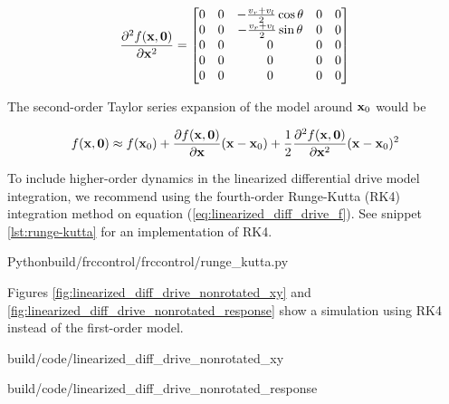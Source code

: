 \begin{equation*}
  \frac{\partial^2 f(\mathbf{x}, \mathbf{0})}{\partial\mathbf{x}^2} =
  \begin{bmatrix}
    0 & 0 & -\frac{v_r + v_l}{2}\cos\theta & 0 & 0 \\
    0 & 0 & -\frac{v_r + v_l}{2}\sin\theta & 0 & 0 \\
    0 & 0 & 0 & 0 & 0 \\
    0 & 0 & 0 & 0 & 0 \\
    0 & 0 & 0 & 0 & 0
  \end{bmatrix}
\end{equation*}

The second-order Taylor series expansion of the \gls{model} around $\mathbf{x}_0$
would be

\begin{equation*}
  f(\mathbf{x}, \mathbf{0}) \approx f(\mathbf{x}_0) +
    \frac{\partial f(\mathbf{x}, \mathbf{0})}{\partial\mathbf{x}}(\mathbf{x} - \mathbf{x}_0) +
    \frac{1}{2}\frac{\partial^2 f(\mathbf{x}, \mathbf{0})}{\partial\mathbf{x}^2}
    (\mathbf{x} - \mathbf{x}_0)^2
\end{equation*}

To include higher-order dynamics in the linearized differential drive model
integration, we recommend using the fourth-order Runge-Kutta (RK4) integration
method on equation (\ref{eq:linearized_diff_drive_f}). See snippet
\ref{lst:runge-kutta} for an implementation of RK4.

\begin{code}{Python}{build/frccontrol/frccontrol/runge_kutta.py}
  \caption{Fourth-order Runge-Kutta integration in Python}
  \label{lst:runge-kutta}
\end{code}

Figures \ref{fig:linearized_diff_drive_nonrotated_xy} and
\ref{fig:linearized_diff_drive_nonrotated_response} show a simulation using RK4
instead of the first-order \gls{model}.

\begin{bookfigure}
  \begin{minisvg}{build/code/linearized_diff_drive_nonrotated_xy}
    \caption{Linearized differential drive controller (global reference frame
      formulation) x-y plot}
    \label{fig:linearized_diff_drive_nonrotated_xy}
  \end{minisvg}
  \hfill
  \begin{minisvg}{build/code/linearized_diff_drive_nonrotated_response}
    \caption{Linearized differential drive controller (global reference frame
      formulation) response}
    \label{fig:linearized_diff_drive_nonrotated_response}
  \end{minisvg}
\end{bookfigure}

